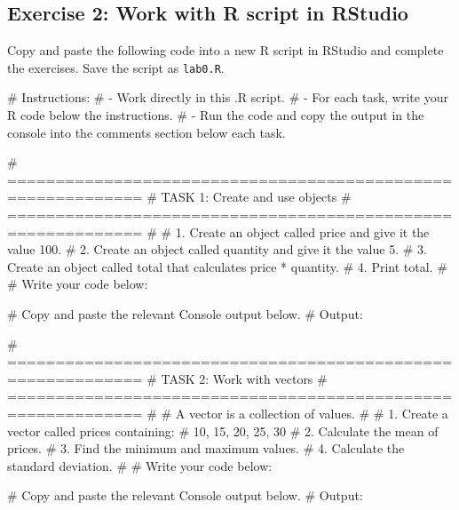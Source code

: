 \documentclass[
  12pt,
  letterpaper,
]{scrbook}
\newenvironment{Shaded}{\begin{snugshade}}{\end{snugshade}}
\newcommand{\AlertTok}[1]{\textcolor[rgb]{0.68,0.00,0.00}{#1}}
\newcommand{\CommentTok}[1]{\textcolor[rgb]{0.37,0.37,0.37}{#1}}
\theoremstyle{plain}
\theoremstyle{definition}
\theoremstyle{remark}
\begin{document}
\subsection{Exercise 2: Work with R script in
RStudio}\label{exercise-2-work-with-r-script-in-rstudio}

Copy and paste the following code into a new R script in RStudio and
complete the exercises. Save the script as \texttt{lab0.R}.

\begin{Shaded}
\begin{Highlighting}[]
\CommentTok{\# Instructions:}
\CommentTok{\# {-} Work directly in this .R script.}
\CommentTok{\# {-} For each task, write your R code below the instructions.}
\CommentTok{\# {-} Run the code and copy the output in the console into the comments section below each task.}

\CommentTok{\# ============================================================}
\CommentTok{\# }\AlertTok{TASK}\CommentTok{ 1: Create and use objects}
\CommentTok{\# ============================================================}
\CommentTok{\#}
\CommentTok{\# 1. Create an object called \textasciigrave{}price\textasciigrave{} and give it the value 100.}
\CommentTok{\# 2. Create an object called \textasciigrave{}quantity\textasciigrave{} and give it the value 5.}
\CommentTok{\# 3. Create an object called \textasciigrave{}total\textasciigrave{} that calculates price * quantity.}
\CommentTok{\# 4. Print \textasciigrave{}total\textasciigrave{}.}
\CommentTok{\#}
\CommentTok{\# Write your code below:}


\CommentTok{\# Copy and paste the relevant Console output below.}
\CommentTok{\# Output:}


\CommentTok{\# ============================================================}
\CommentTok{\# }\AlertTok{TASK}\CommentTok{ 2: Work with vectors}
\CommentTok{\# ============================================================}
\CommentTok{\#}
\CommentTok{\# A vector is a collection of values.}
\CommentTok{\#}
\CommentTok{\# 1. Create a vector called \textasciigrave{}prices\textasciigrave{} containing:}
\CommentTok{\#    10, 15, 20, 25, 30}
\CommentTok{\# 2. Calculate the mean of \textasciigrave{}prices\textasciigrave{}.}
\CommentTok{\# 3. Find the minimum and maximum values.}
\CommentTok{\# 4. Calculate the standard deviation.}
\CommentTok{\#}
\CommentTok{\# Write your code below:}


\CommentTok{\# Copy and paste the relevant Console output below.}
\CommentTok{\# Output:}



\end{Highlighting}
\end{Shaded}
\end{document}
